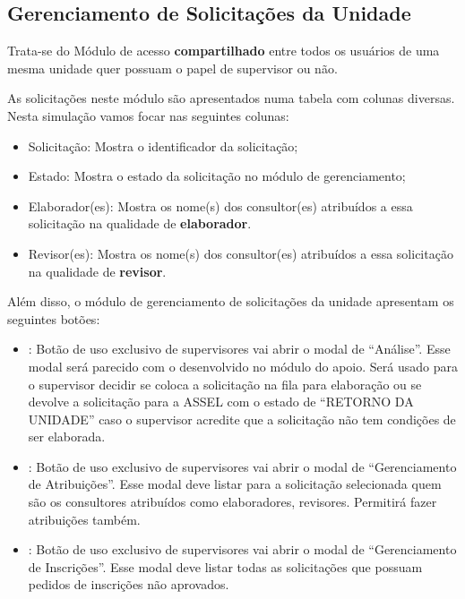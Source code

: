 \begin{landscape}
\subsection*{Gerenciamento de Solicitações da Unidade}

	Trata-se do Módulo de acesso \textbf{compartilhado} entre todos os usuários de uma mesma unidade quer possuam o papel de supervisor ou não.  

	As solicitações neste módulo são apresentados numa tabela com colunas diversas. Nesta simulação vamos focar nas seguintes colunas:
	
	\begin{itemize}
		\item Solicitação: Mostra o identificador da solicitação;
		\item Estado: Mostra o estado da solicitação no módulo de gerenciamento;
		\item Elaborador(es): Mostra os nome(s) dos consultor(es) atribuídos a essa solicitação na qualidade de \textbf{elaborador}.
		\item Revisor(es): Mostra os nome(s) dos consultor(es) atribuídos a essa solicitação na qualidade de \textbf{revisor}.
	\end{itemize}
	
	Além disso, o módulo de gerenciamento de solicitações da unidade apresentam os seguintes botões:
	
	\begin{itemize}
		\item \bAnalisar: Botão de uso exclusivo de supervisores vai abrir o modal de ``Análise''. Esse modal será parecido com o desenvolvido no módulo do apoio. Será usado para o supervisor decidir se coloca a solicitação na fila para elaboração ou se devolve a solicitação para a ASSEL com o estado de ``RETORNO DA UNIDADE'' caso o supervisor acredite que a solicitação não tem condições de ser elaborada. 

		\item \bGerAtrib: Botão de uso exclusivo de supervisores vai abrir o modal de ``Gerenciamento de Atribuições''. Esse modal deve listar para a solicitação selecionada quem são os consultores atribuídos como elaboradores, revisores. Permitirá fazer atribuições também.
		
		\item \bGerInscricoes: Botão de uso exclusivo de supervisores vai abrir o modal de ``Gerenciamento de Inscrições''. Esse modal deve listar todas as solicitações que possuam pedidos de inscrições não aprovados.
		

\end{itemize}
\end{landscape}
